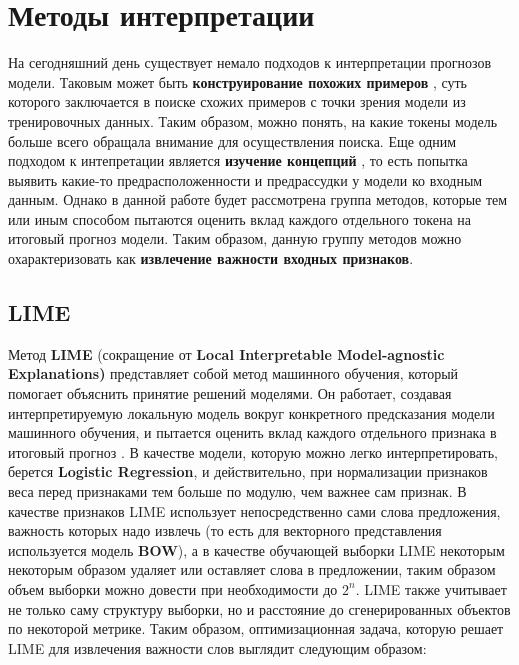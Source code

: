 \section{Методы интерпретации}
\label{sec:Interpretation} 

\noindent\hspace{0.6cm}На сегодняшний день существует немало подходов к интерпретации прогнозов модели. Таковым может быть \textbf{конструирование похожих примеров} \cite{adversarialgenerating2}, суть которого заключается в поиске схожих примеров с точки зрения модели из тренировочных данных. Таким образом, можно понять, на какие токены модель больше всего обращала внимание для осуществления поиска. Еще одним подходом к интепретации является \textbf{изучение концепций} \cite{adversarialgenerating2}, то есть попытка выявить какие-то предрасположенности и предрассудки у модели ко входным данным. Однако в данной работе будет рассмотрена группа методов, которые тем или иным способом пытаются оценить вклад каждого отдельного токена на итоговый прогноз модели. Таким образом, данную группу методов можно охарактеризовать как \textbf{извлечение важности входных признаков}. 

\subsection{LIME}

\noindent\hspace{0.6cm}Метод \textbf{LIME} (сокращение от \textbf{Local Interpretable Model-agnostic Explanations)} представляет собой метод машинного обучения, который помогает объяснить принятие решений моделями. Он работает, создавая интерпретируемую локальную модель вокруг конкретного предсказания модели машинного обучения, и пытается оценить вклад каждого отдельного признака в итоговый прогноз \cite{optimization4}. В качестве модели, которую можно легко интерпретировать, берется \textbf{Logistic Regression}, и действительно, при нормализации признаков веса перед признаками тем больше по модулю, чем важнее сам признак. В качестве признаков LIME использует непосредственно сами слова предложения, важность которых надо извлечь (то есть для векторного представления используется модель \textbf{BOW}), а в качестве обучающей выборки LIME некоторым некоторым образом удаляет или оставляет слова в предложении, таким образом объем выборки можно довести при необходимости до $2^{n}$. LIME также учитывает не только саму структуру выборки, но и расстояние до сгенерированных объектов по некоторой метрике. Таким образом, оптимизационная задача, которую решает LIME для извлечения важности слов выглядит следующим образом:

